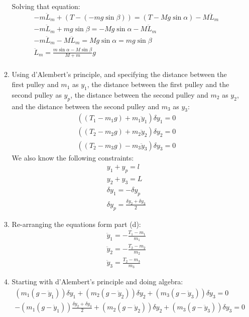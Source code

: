 \documentclass[12pt]{article}
\begin{document}
\begin{enumerate}
\begin{enumerate}
      Solving that equation:
      \begin{gather*}
        -m\ddot{L}_m+(T-(-mg\sin\beta))=(T-Mg\sin\alpha)-M\ddot{L}_m\\
        -m\ddot{L}_m+mg\sin\beta=-Mg\sin\alpha-M\ddot{L}_m\\
        -m\ddot{L}_m-M\ddot{L}_m=Mg\sin\alpha=mg\sin\beta\\
        \ddot{L}_m=\frac{m\sin\alpha-M\sin\beta}{M+m}g\\
      \end{gather*}
      \item
      Using d'Alembert's principle, and specifying the distance between the first pulley and $m_1$ as $y_1$, the distance between the first pulley and the second pulley as $y_p$, the distance between the second pulley and $m_2$ as $y_2$, and the distance between the second pulley and $m_3$ as $y_3$:
      \begin{gather*}
        ((T_1-m_1 g)+m_1\ddot{y}_1)\delta y_1=0\\
        ((T_2-m_2 g)+m_2\ddot{y}_2)\delta y_2=0\\
        ((T_2-m_3 g)-m_3\ddot{y}_3)\delta y_3=0
      \end{gather*}
      We also know the following constraints:
      \begin{gather*}
        y_1+y_p=l\\
        y_2+y_3=L\\
        \delta y_1=-\delta y_p\\
        \delta y_p=\frac{\delta y_2+\delta y_3}{2}
      \end{gather*}
      \item
      Re-arranging the equations form part (d):
      \begin{gather*}
        \ddot{y}_1=-\frac{T_1-m_1}{m_1}\\
        \ddot{y}_2=-\frac{T_2-m_2}{m_2}\\
        \ddot{y}_3=\frac{T_2-m_3}{m_3}
      \end{gather*}
      \item
      Starting with d'Alembert's principle and doing algebra:
      \begin{gather*}
        (m_1 (g-\ddot{y}_1))\delta y_1+(m_2 (g-\ddot{y}_2))\delta y_2+(m_3 (g-\ddot{y}_3))\delta y_3=0\\
        -(m_1 (g-\ddot{y}_1))\frac{\delta y_2+\delta y_3}{2}+(m_2 (g-\ddot{y}_2))\delta y_2+(m_3 (g-\ddot{y}_3))\delta y_3=0\\
      \end{gather*}

\end{enumerate}
\end{enumerate}
\end{document}
